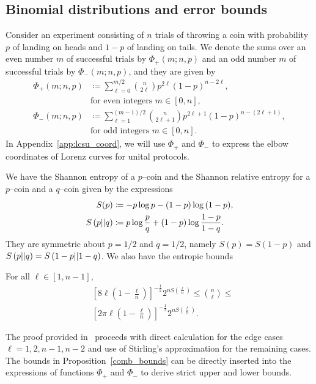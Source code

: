 \documentclass[pra,
aps,
twocolumn,
superscriptaddress,
groupedaddress,
nofootinbib,
reprint
]{revtex4-1}
\begin{document}
\subsection{Binomial distributions and error bounds}\label{app:phi}
Consider an experiment consisting of $n$ trials of throwing a coin with probability $p$ of landing on heads and $1-p$ of landing on tails.
We denote the sums over an even number $m$ of successful trials by $\Phi_+(m; n, p)$ and an odd number $m$ of successful trials by $\Phi_-(m; n, p)$, and they are given by
\begin{align}	
	\Phi_+(m; n, p) &\coloneqq \sum\limits_{\ell=0}^{m/2} \binom{n}{2\ell} p^{2\ell} (1-p)^{n-2\ell}, \nonumber\\ 
	&\text{for even integers } m\in[0,n], \label{eq:fp_app} \\
	\Phi_-(m; n, p) &\coloneqq \sum\limits_{\ell=1}^{(m-1)/2} \binom{n}{2\ell+1} p^{2\ell+1} (1-p)^{n-(2\ell+1)}, \nonumber\\ 
	&\text{for odd integers }m\in[0,n]. \label{eq:fn_app}
\end{align}
In Appendix~\ref{app:lcsu_coord}, we will use $\Phi_+$ and $\Phi_-$ to express the elbow coordinates of Lorenz curves for unital protocols.

We have the Shannon entropy of a $p$--coin and the Shannon relative entropy for a $p$--coin and a $q$--coin given by the expressions
\begin{align}
	S(p) &\coloneqq -p\log{p} -(1-p)\log{(1-p)}, \label{eq:ent}\\
	S\left( p \middle\vert\middle\vert q \right) &\coloneqq p \log{\frac{p}{q}} + (1-p) \log{\frac{1-p}{1-q}}. \label{eq:ent_rel}
\end{align}
They are symmetric about $p=1/2$ and $q=1/2$, namely $S(p) = S(1-p)$ and $S\left( p \middle\vert\middle\vert q \right) = S\left( 1-p \middle\vert\middle\vert 1-q \right)$. We also have the entropic bounds
\begin{proposition}\label{comb_bounds}
	For all $\ell\in [1,n-1]$,
	\begin{align}
		&\left[ 8\ell\left(1-\frac{\ell}{n}\right) \right]^{-\frac{1}{2}} 2^{n S\left(\frac{\ell}{n}\right)} \leq \binom{n}{\ell} \leq \\
		&\left[ 2\pi \ell\left(1-\frac{\ell}{n}\right) \right]^{-\frac{1}{2}} 2^{n S\left(\frac{\ell}{n}\right)}.
	\end{align}
\end{proposition}
The proof provided in~\cite{cit:ash} proceeds with direct calculation for the edge cases $\ell = 1,2, n-1, n-2$ and use of Stirling's approximation for the remaining cases. The bounds in Proposition~\ref{comb_bounds} can be directly inserted into the expressions of functions $\Phi_+$ and $\Phi_-$ to derive strict upper and lower bounds.
\end{document}
